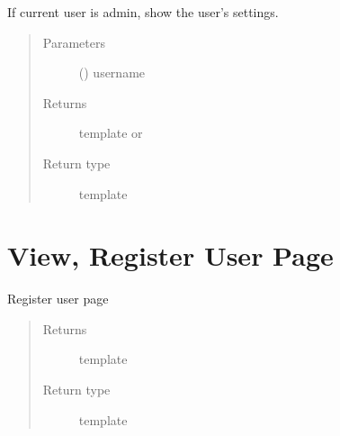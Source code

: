 \documentclass[letterpaper,10pt,english]{sphinxmanual}
\begin{document}
\begin{fulllineitems}
\label{\detokenize{index:view.user_settings.user_settings}}
If current user is admin, show the user’s settings.
\begin{quote}\begin{description}
\item[{Parameters}] \leavevmode
{} () \textendash{} username

\item[{Returns}] \leavevmode
template  or 

\item[{Return type}] \leavevmode
template

\end{description}\end{quote}

\end{fulllineitems}



\chapter{View, Register User Page}
\label{\detokenize{index:module-view.add_user}}\label{\detokenize{index:view-register-user-page}}

\begin{fulllineitems}
\label{\detokenize{index:view.add_user.add_user_page}}
Register user page
\begin{quote}\begin{description}
\item[{Returns}] \leavevmode
template 

\item[{Return type}] \leavevmode
template

\end{description}\end{quote}

\end{fulllineitems}
\end{document}
